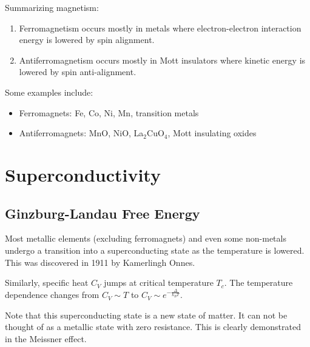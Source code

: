 \documentclass[12pt,a4paper,titlepage]{article}
\begin{document}
Summarizing magnetism:
\begin{enumerate}
\item Ferromagnetism occurs mostly in metals where electron-electron interaction energy is lowered by spin alignment.
\item Antiferromagnetism occurs mostly in Mott insulators where kinetic energy is lowered by spin anti-alignment.
\end{enumerate}
Some examples include:
\begin{itemize}
\item[] Ferromagnets: Fe, Co, Ni, Mn, transition metals
\item[] Antiferromagnets: MnO, NiO, La$_{2}$CuO$_{4}$, Mott insulating oxides
\end{itemize}

\newpage
\section{Superconductivity}
\subsection{Ginzburg-Landau Free Energy}
Most metallic elements (excluding ferromagnets) and even some non-metals undergo a transition into a superconducting state as the temperature is lowered. This was discovered in 1911 by Kamerlingh Onnes.
\begin{center}
\end{center}
Similarly, specific heat $C_{V}$ jumps at critical temperature $T_{c}$. The temperature dependence changes from $C_{V}\sim T$ to $C_{V}\sim e^{-\frac{\Delta}{k_{B}T}}$.
\begin{center}
\end{center}
Note that this superconducting state is a new state of matter. It can not be thought of as a metallic state with zero resistance. This is clearly demonstrated in the Meissner effect.
\end{document}
